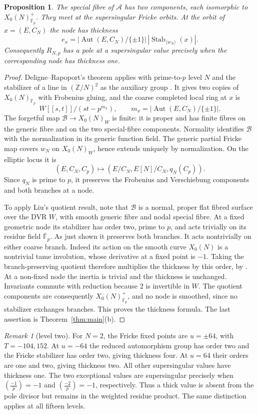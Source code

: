 \documentclass[11pt,a4paper]{article}
\numberwithin{equation}{section}
\newtheorem{proposition}[theorem]{Proposition}
\theoremstyle{definition}
\theoremstyle{remark}
\newtheorem{remark}[theorem]{Remark}
\newcommand{\Fb}{\overline{\mathbb F}_p}
\newcommand{\Z}{\mathbb Z}
\newcommand{\Aut}{\operatorname{Aut}}
\newcommand{\Stab}{\operatorname{Stab}}
\begin{document}
\begin{proposition}\label{prop:geometry}
The special fibre of $\mathcal A$ has two components, each isomorphic to
$X_0(N)^+_{\Fb}$. They meet at the supersingular Fricke orbits. At the orbit of
$x=(E,C_N)$ the node has thickness
\[
e_x=|\Aut(E,C_N)/\{\pm1\}|\,
|\Stab_{\langle w_N\rangle}(x)|.
\]
Consequently $R_{N,p}$ has a pole at a supersingular value precisely when the
corresponding node has thickness one.
\end{proposition}
\begin{proof}
Deligne--Rapoport's theorem applies with prime-to-$p$ level $N$ and the stabilizer
of a line in $(\Z/N)^2$ as the auxiliary group
\citep[V, 1.14--1.20; VI, Theorem~6.9, especially (6.9.1)]{DR73}.
It gives two copies of $X_0(N)_{\Fb}$ with Frobenius gluing, and the coarse
completed local ring at $x$ is
\[
W[[s,t]]/(st-p^{m_x}),\qquad m_x=|\Aut(E,C_N)/\{\pm1\}|.
\]
The forgetful map $\mathcal B\to X_0(N)_W$ is finite: it is proper and has finite
fibres on the generic fibre and on the two special-fibre components.
Normality identifies $\mathcal B$ with the normalization in its generic function
field. The generic partial Fricke map covers $w_N$ on $X_0(N)_W$, hence extends
uniquely by normalization. On the elliptic locus it is
\[
(E,C_N,C_p)\longmapsto(E/C_N,E[N]/C_N,q_N(C_p)).
\]
Since $q_N$ is prime to $p$, it preserves the Frobenius and Verschiebung components
and both branches at a node.

To apply Liu's quotient result, note that $\mathcal B$ is a normal,
proper flat fibred surface over the DVR $W$, with smooth generic fibre
and nodal special fibre. At a fixed geometric node its stabilizer has
order two, prime to $p$, and acts trivially on its residue field $\Fb$.
As just shown it preserves both branches. It acts nontrivially on either
coarse branch. Indeed its action on the smooth curve $X_0(N)$ is a nontrivial
tame involution, whose derivative at a fixed point is $-1$.
Taking the branch-preserving quotient therefore multiplies the thickness by
this order, by \citet[Proposition~10.3.48(b)--(c), pp.~526--528]{Liu02}.
At a non-fixed node the inertia is trivial and the thickness is unchanged.
Invariants commute with reduction because $2$ is invertible in $W$.
The quotient components are consequently $X_0(N)^+_{\Fb}$, and no node is
smoothed, since no stabilizer exchanges branches. This proves the thickness formula.
The last assertion is Theorem~\ref{thm:main}(b).
\end{proof}

\begin{remark}[level two]
For $N=2$, the Fricke fixed points are $u=\pm64$, with $T=-104,152$.
At $u=-64$ the reduced automorphism group has order two and the Fricke stabilizer
has order two, giving thickness four. At $u=64$ their orders are one and two,
giving thickness two. All other supersingular values have thickness one.
The two exceptional values are supersingular precisely when
$\left(\frac{-1}{p}\right)=-1$ and $\left(\frac{-2}{p}\right)=-1$, respectively.
Thus a thick value is absent from the pole divisor but remains in the
weighted residue product. The same distinction applies at all fifteen levels.
\end{remark}
\end{document}
